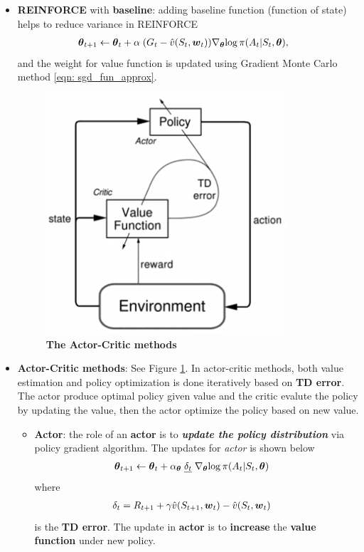 \documentclass[11pt]{article}
\begin{document}
\begin{itemize}
\begin{itemize}
\item \textbf{REINFORCE} with \textbf{baseline}: adding baseline function (function of state) helps to reduce variance in REINFORCE
\begin{align}
\boldsymbol{\theta}_{t+1} &\leftarrow \boldsymbol{\theta}_{t} + \alpha \;(G_{t}-\hat{v}(S_t, \boldsymbol{w}_t))\nabla_{\boldsymbol{\theta}}{\log\pi(A_{t}|S_{t}, \boldsymbol{\theta})}, \label{eqn: reinforce_update_w_baseline}
\end{align} and the weight for value function is updated using Gradient Monte Carlo method \eqref{eqn: sgd_fun_approx}. 

\begin{figure}
\begin{minipage}[t]{1\linewidth}
  \centering
  \centerline{\includegraphics[scale = 0.5]{actor_critic.png}}
\end{minipage}
\caption{\footnotesize{\textbf{The Actor-Critic methods}}}
\label{fig: actor_critic}
\end{figure}
\item \textbf{Actor-Critic methods}: See Figure \ref{fig: actor_critic}. In actor-critic methods, both value estimation and policy optimization is done iteratively based on \textbf{TD error}. The actor produce optimal policy given value and the critic evalute the policy by updating the value, then the actor optimize the policy based on new value.
\begin{itemize}
\item \textbf{Actor}: the role of an \textbf{actor} is to \textbf{\emph{update the policy distribution}} via policy gradient algorithm.  The updates for \emph{actor} is shown below
\begin{align}
\boldsymbol{\theta}_{t+1} &\leftarrow \boldsymbol{\theta}_{t} + \alpha_{\boldsymbol{\theta}}  \;\underline{\delta_t}\; \nabla_{\boldsymbol{\theta}}{\log\pi(A_{t}|S_{t}, \boldsymbol{\theta})} \label{eqn: actor_update}
\end{align} where 
\begin{align*}
\delta_{t}&= R_{t+1} + \gamma \hat{v}(S_{t+1}, \boldsymbol{w}_{t}) - \hat{v}(S_{t}, \boldsymbol{w}_{t})
\end{align*}
 is the \textbf{TD error}. The update in \textbf{actor} is to \textbf{increase} the \textbf{value function} under new policy.


\end{itemize}
\end{itemize}
\end{itemize}
\end{document}
